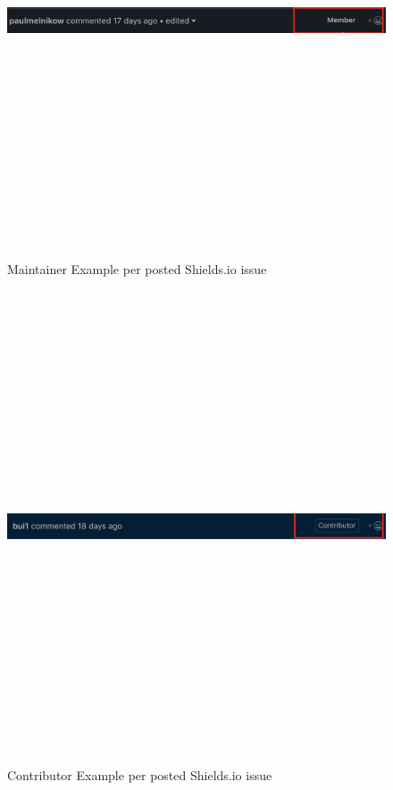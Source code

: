 \documentclass[12pt, letterpaper]{article}
\begin{document}
\begin{figure}[!htb]
    \centerline{
        \includegraphics[width=14cm,height=14cm,keepaspectratio=true]{maintainer}
    }
    \caption{
        Maintainer Example per posted Shields.io issue \cite{shieldsissue}
    }
    \label{maintainer}
\end{figure}

\begin{figure}[!htb]
    \centerline{
        \includegraphics[width=14cm,height=14cm,keepaspectratio=true]{contributor}
    }
    \caption{
        Contributor Example per posted Shields.io issue \cite{shieldsissue}
    }
    \label{contributor}
\end{figure}
\end{document}
